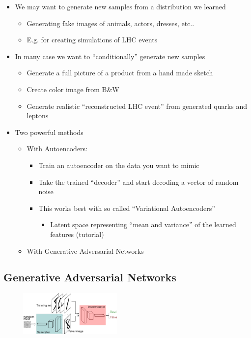 \begin{itemize}
	\item We may want to generate new samples from a distribution we learned
	\begin{itemize}
		\item Generating fake images of animals, actors, dresses, etc..
		\item E.g. for creating simulations of LHC events
	\end{itemize}
	\item In many case we want to “conditionally” generate new samples
	\begin{itemize}
		\item Generate a full picture of a product from a hand made sketch
		\item Create color image from B\&W 
		\item Generate realistic “reconstructed LHC event” from generated quarks and leptons
	\end{itemize}
	\item Two powerful methods
	\begin{itemize}
		\item With Autoencoders:
		\begin{itemize}
			\item Train an autoencoder on the data you want to mimic
			\item Take the trained “decoder” and start decoding a vector of random noise
			\item This works best with so called “Variational Autoencoders”
			\begin{itemize}
				\item Latent space representing “mean and variance” of the learned	features (tutorial)
			\end{itemize}
		\end{itemize}
	\item With Generative Adversarial Networks
	\end{itemize}
\end{itemize}

\subsection{Generative Adversarial Networks}

\begin{figure}
	\includegraphics[width=0.45\textwidth]{figure_ml/gan.png}
\end{figure}

